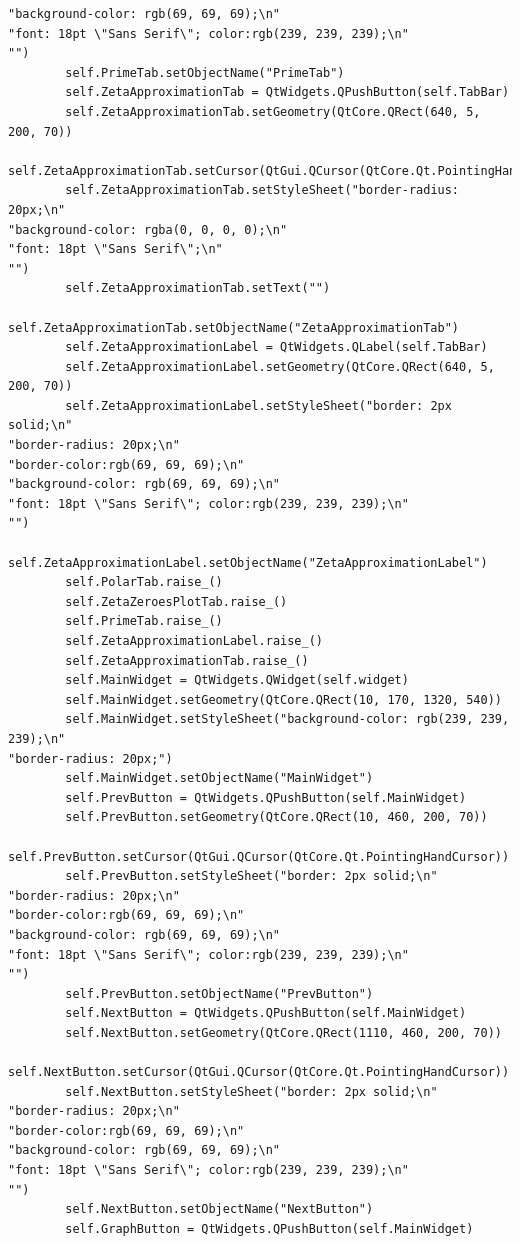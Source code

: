 \documentclass{article}
\begin{document}
\begin{lstlisting}
"background-color: rgb(69, 69, 69);\n"
"font: 18pt \"Sans Serif\"; color:rgb(239, 239, 239);\n"
"")
        self.PrimeTab.setObjectName("PrimeTab")
        self.ZetaApproximationTab = QtWidgets.QPushButton(self.TabBar)
        self.ZetaApproximationTab.setGeometry(QtCore.QRect(640, 5, 200, 70))
        self.ZetaApproximationTab.setCursor(QtGui.QCursor(QtCore.Qt.PointingHandCursor))
        self.ZetaApproximationTab.setStyleSheet("border-radius: 20px;\n"
"background-color: rgba(0, 0, 0, 0);\n"
"font: 18pt \"Sans Serif\";\n"
"")
        self.ZetaApproximationTab.setText("")
        self.ZetaApproximationTab.setObjectName("ZetaApproximationTab")
        self.ZetaApproximationLabel = QtWidgets.QLabel(self.TabBar)
        self.ZetaApproximationLabel.setGeometry(QtCore.QRect(640, 5, 200, 70))
        self.ZetaApproximationLabel.setStyleSheet("border: 2px solid;\n"
"border-radius: 20px;\n"
"border-color:rgb(69, 69, 69);\n"
"background-color: rgb(69, 69, 69);\n"
"font: 18pt \"Sans Serif\"; color:rgb(239, 239, 239);\n"
"")
        self.ZetaApproximationLabel.setObjectName("ZetaApproximationLabel")
        self.PolarTab.raise_()
        self.ZetaZeroesPlotTab.raise_()
        self.PrimeTab.raise_()
        self.ZetaApproximationLabel.raise_()
        self.ZetaApproximationTab.raise_()
        self.MainWidget = QtWidgets.QWidget(self.widget)
        self.MainWidget.setGeometry(QtCore.QRect(10, 170, 1320, 540))
        self.MainWidget.setStyleSheet("background-color: rgb(239, 239, 239);\n"
"border-radius: 20px;")
        self.MainWidget.setObjectName("MainWidget")
        self.PrevButton = QtWidgets.QPushButton(self.MainWidget)
        self.PrevButton.setGeometry(QtCore.QRect(10, 460, 200, 70))
        self.PrevButton.setCursor(QtGui.QCursor(QtCore.Qt.PointingHandCursor))
        self.PrevButton.setStyleSheet("border: 2px solid;\n"
"border-radius: 20px;\n"
"border-color:rgb(69, 69, 69);\n"
"background-color: rgb(69, 69, 69);\n"
"font: 18pt \"Sans Serif\"; color:rgb(239, 239, 239);\n"
"")
        self.PrevButton.setObjectName("PrevButton")
        self.NextButton = QtWidgets.QPushButton(self.MainWidget)
        self.NextButton.setGeometry(QtCore.QRect(1110, 460, 200, 70))
        self.NextButton.setCursor(QtGui.QCursor(QtCore.Qt.PointingHandCursor))
        self.NextButton.setStyleSheet("border: 2px solid;\n"
"border-radius: 20px;\n"
"border-color:rgb(69, 69, 69);\n"
"background-color: rgb(69, 69, 69);\n"
"font: 18pt \"Sans Serif\"; color:rgb(239, 239, 239);\n"
"")
        self.NextButton.setObjectName("NextButton")
        self.GraphButton = QtWidgets.QPushButton(self.MainWidget)

\end{lstlisting}
\end{document}
